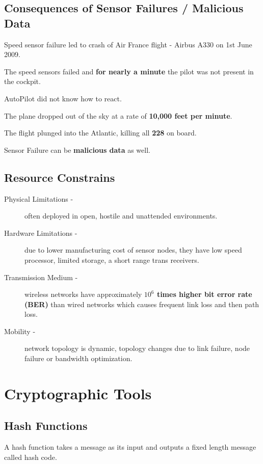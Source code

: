 \documentclass[%
  slidesonly,%
  semlayer%
  ]{seminar}                                  %
\begin{document}
\begin{slide}
  \subsection*{Consequences of Sensor Failures / Malicious Data}
      \vfill
      Speed sensor failure led to crash of Air France flight - Airbus A330 on 1st June 2009.
      
      The speed sensors failed and \textbf{for nearly a minute} the pilot was not present in the cockpit.

      AutoPilot did not know how to react. 

      The plane dropped out of the sky at a rate of \textbf{10,000 feet per minute}.
          
      The flight plunged into the Atlantic, killing all \textbf{228} on board.      
      
      Sensor Failure can be \textbf{malicious data} as well.

      \vfill
      \clearpage

  \subsection*{Resource Constrains}
    \vfill
    \begin{description}
      \item[Physical Limitations -] often deployed in open, hostile and unattended environments.

      \item[Hardware Limitations -] due to lower manufacturing cost of sensor nodes, they have low speed processor, limited storage, a short range trans receivers.

      \item[Transmission Medium -] wireless networks have approximately \textbf{$10^6$ times higher bit error rate (BER)} than wired networks which causes frequent link loss and then path loss.

      \item[Mobility -] network topology is dynamic, topology changes due to link failure, node failure or bandwidth optimization.
    \end{description}
    \vfill
    \clearpage

\section*{Cryptographic Tools}
  \subsection*{Hash Functions}
    A hash function takes a message as its input and outputs a fixed length message called hash code.


\end{slide}
\end{document}
